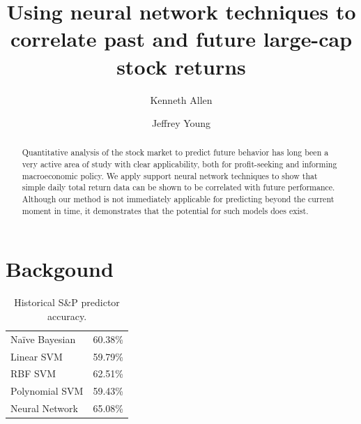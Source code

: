 \documentclass[format=acmlarge]{acmart}
\begin{document}
\title{Using neural network techniques to correlate past and future large-cap stock returns}

\author{Kenneth Allen}

\author{Jeffrey Young}

\begin{abstract}
Quantitative analysis of the stock market to predict future behavior has long been a very active area of study with clear applicability, both for profit-seeking and informing macroeconomic policy.  We apply support neural network techniques to show that simple daily total return data can be shown to be correlated with future performance.  Although our method is not immediately applicable for predicting beyond the current moment in time, it demonstrates that the potential for such models does exist.
\end{abstract}


\maketitle

\section{Backgound}
\begin{table}
  \caption{Historical S\&P predictor accuracy.}
  \label{tab:one}
  \begin{tabular}{l|l}
    Na\"{i}ve Bayesian & 60.38\%\\
    Linear SVM & 59.79\%\\
    RBF SVM & 62.51\%\\
    Polynomial SVM & 59.43\%\\
    Neural Network & 65.08\%\\
  \end{tabular}
\end{table}
\end{document}
